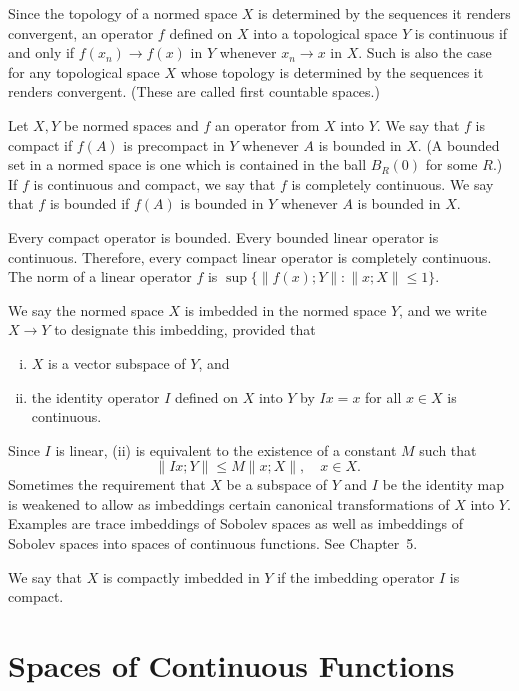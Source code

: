 \begin{para}[Operators]
  Since the topology of a normed space $X$ is determined by the sequences it renders convergent, an operator $f$ defined on $X$ into a topological space $Y$ is continuous if and only if $f\left(x_n\right) \rightarrow f(x)$ in $Y$ whenever $x_n \rightarrow x$ in $X$. Such is also the case for any topological space $X$ whose topology is determined by the sequences it renders convergent. (These are called first countable spaces.) 
  
  Let $X, Y$ be normed spaces and $f$ an operator from $X$ into $Y$. We say that $f$ is compact if $f(A)$ is precompact in $Y$ whenever $A$ is bounded in $X$. (A bounded set in a normed space is one which is contained in the ball $B_R(0)$ for some $R$.) If $f$ is continuous and compact, we say that $f$ is completely continuous. We say that $f$ is bounded if $f(A)$ is bounded in $Y$ whenever $A$ is bounded in $X$.

  Every compact operator is bounded. Every bounded linear operator is continuous. Therefore, every compact linear operator is completely continuous. The norm of a linear operator $f$ is $\sup \{\|f(x) ; Y\|:\|x ; X\| \leq 1\}$.
\end{para}


\begin{para}[Imbeddings]
  We say the normed space $X$ is imbedded in the normed space $Y$, and we write $X \rightarrow Y$ to designate this imbedding, provided that
  \begin{enumerate}[(i)]
    \item $X$ is a vector subspace of $Y$, and
    \item the identity operator $I$ defined on $X$ into $Y$ by $I x=x$ for all $x \in X$ is continuous.
  \end{enumerate}
  Since $I$ is linear, (ii) is equivalent to the existence of a constant $M$ such that
  \[
  \|I x ; Y\| \leq M\|x ; X\|, \quad x \in X \text {. }
  \]
  Sometimes the requirement that $X$ be a subspace of $Y$ and $I$ be the identity map is weakened to allow as imbeddings certain canonical transformations of $X$ into $Y$. Examples are trace imbeddings of Sobolev spaces as well as imbeddings of Sobolev spaces into spaces of continuous functions. See Chapter~5.

  We say that $X$ is compactly imbedded in $Y$ if the imbedding operator $I$ is compact.
\end{para}


\section{Spaces of Continuous Functions}


